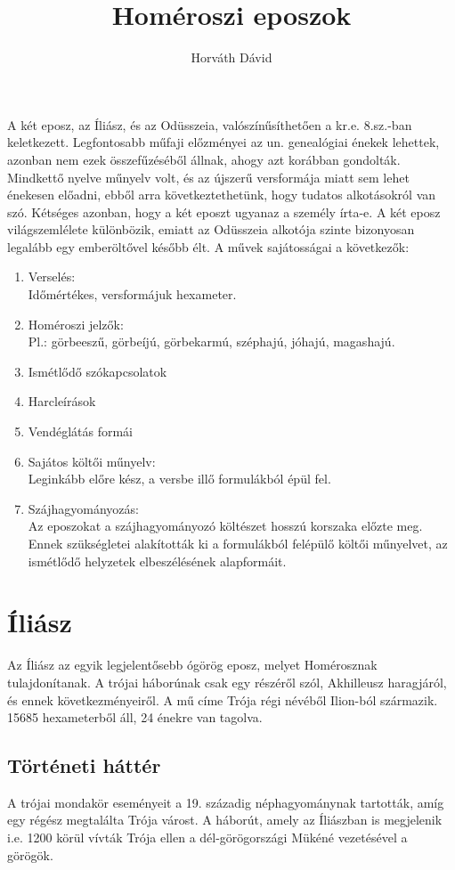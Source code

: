 \documentclass[]{article}
\title{Homéroszi eposzok}
\author{Horváth Dávid}
\begin{document}
\maketitle

	A két eposz, az Íliász, és az Odüsszeia, valószínűsíthetően a kr.e. 8.sz.-ban keletkezett. Legfontosabb műfaji előzményei az un. genealógiai énekek lehettek, azonban nem ezek összefűzéséből állnak, ahogy azt korábban gondolták. Mindkettő nyelve műnyelv volt, és az újszerű versformája miatt sem lehet énekesen előadni, ebből arra következtethetünk, hogy tudatos alkotásokról van szó. Kétséges azonban, hogy a két eposzt ugyanaz a személy írta-e. A két eposz világszemlélete különbözik, emiatt az Odüsszeia alkotója szinte bizonyosan legalább egy emberöltővel később élt.\cite{TetelOdusszeia} A művek sajátosságai a következők:
	\begin{enumerate}
		\item Verselés:\\
		Időmértékes, versformájuk hexameter.
		\item Homéroszi jelzők:\\
		Pl.: görbeeszű, görbeíjú, görbekarmú, széphajú, jóhajú, magashajú.
		\item Ismétlődő szókapcsolatok
		\item Harcleírások
		\item Vendéglátás formái
		\item Sajátos költői műnyelv:\\
		Leginkább előre kész, a versbe illő formulákból épül fel.
		\item Szájhagyományozás:\\
		Az eposzokat a szájhagyományozó költészet hosszú korszaka előzte meg. Ennek szükségletei alakították ki a formulákból felépülő költői műnyelvet, az ismétlődő helyzetek elbeszélésének alapformáit. 
	\end{enumerate}
\cite{Sajatossagok}
	\section{Íliász}
		Az Íliász az egyik legjelentősebb ógörög eposz, melyet Homérosznak tulajdonítanak. A trójai háborúnak csak egy részéről szól, Akhilleusz haragjáról, és ennek következményeiről. A mű címe Trója régi névéből Ilion-ból származik. 15685 hexameterből áll, 24 énekre van tagolva.
		\subsection{Történeti háttér}
			A trójai mondakör eseményeit a 19. századig néphagyománynak tartották, amíg egy régész megtalálta Trója várost. A háborút, amely az Íliászban is megjelenik i.e. 1200 körül vívták Trója ellen a dél-görögországi Mükéné vezetésével a görögök.			\cite{WIliasz}
\end{document}
